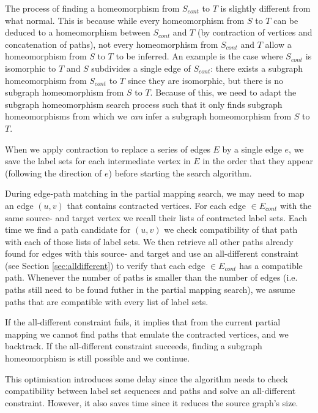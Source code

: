The process of finding a homeomorphism from $S_{cont}$ to $T$ is slightly different from what normal. This is because while every homeomorphism from $S$ to $T$ can be deduced to a homeomorphism between $S_{cont}$ and $T$ (by contraction of vertices and concatenation of paths), not every homeomorphism from $S_{cont}$ and $T$ allow a homeomorphism from $S$ to $T$ to be inferred. An example is the case where $S_{cont}$ is isomorphic to $T$ and $S$ subdivides a single edge of $S_{cont}$: there exists a subgraph homeomorphism from $S_{cont}$ to $T$ since they are isomorphic, but there is no subgraph homeomorphism from $S$ to $T$. Because of this, we need to adapt the subgraph homeomorphism search process such that it only finds subgraph homeomorphisms from which we \textit{can} infer a subgraph homeomorphism from $S$ to $T$.

When we apply contraction to replace a series of edges $E$ by a single edge $e$, we save the label sets for each intermediate vertex in $E$ in the order that they appear (following the direction of $e$) before starting the search algorithm. 

During edge-path matching in the partial mapping search, we may need to map an edge $(u, v)$ that contains contracted vertices. For each edge $\in E_{cont}$ with the same source- and target vertex we recall their lists of contracted label sets. Each time we find a path candidate for $(u, v)$ we check compatibility of that path with each of those lists of label sets. We then retrieve all other paths already found for edges with this source- and target and use an all-different constraint (see Section \ref{sec:alldifferent}) to verify that each edge $\in E_{cont}$ has a compatible path. Whenever the number of paths is smaller than the number of edges (i.e. paths still need to be found futher in the partial mapping search), we assume paths that are compatible with every list of label sets.

If the all-different constraint fails, it implies that from the current partial mapping we cannot find paths that emulate the contracted vertices, and we backtrack. If the all-different constraint succeeds, finding a subgraph homeomorphism is still possible and we continue.

This optimisation introduces some delay since the algorithm needs to check compatibility between label set sequences and paths and solve an all-different constraint. However, it also saves time since it reduces the source graph's size.

